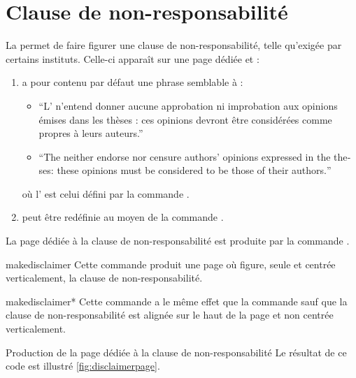 \section{Clause de non-responsabilité}
\label{sec:clause-de-non}

La \yatcl{} permet de faire figurer une clause de non-responsabilité, telle
qu'exigée par certains instituts. Celle-ci apparaît sur une page dédiée et :
\begin{enumerate}
\item a pour contenu par défaut une phrase semblable
  à\selonlangue{} :
  \begin{itemize}
  \item \enquote{L' n'entend donner aucune
      approbation ni improbation aux opinions \'emises dans les th\`eses : ces
      opinions devront \^etre consid\'er\'ees comme propres \`a leurs auteurs.}
  \item \foreignquote{english}{The  neither endorse
      nor censure authors' opinions expressed in the theses: these opinions
      must be considered to be those of their authors.}
  \end{itemize}
  où l' est celui défini par la commande 
  .
\item peut être redéfinie au moyen de la commande .
\end{enumerate}

La page dédiée à la clause de non-responsabilité est produite par la commande
.

\begin{docCommand}{makedisclaimer}{}
  Cette commande produit une page où figure, seule et centrée
  verticalement, la clause de non-responsabilité.
\end{docCommand}

\begin{docCommand}{makedisclaimer*}{}
  Cette commande a le même effet que la commande
   sauf que la clause de non-responsabilité est alignée
  sur le haut de la page et non centrée verticalement.
\end{docCommand}

\begin{dbexample}{Production de la page dédiée à la clause de
    non-responsabilité}{}
  \NoAutoSpacing%
%
  Le résultat de ce code est illustré \vref{fig:disclaimerpage}.
\end{dbexample}

